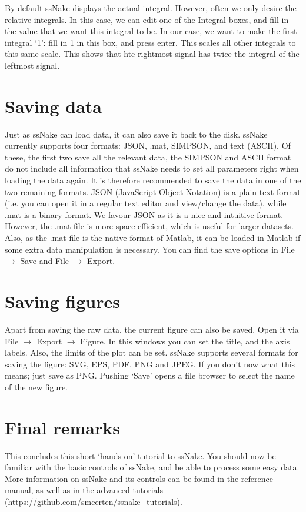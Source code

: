 \documentclass[11pt,a4paper]{article}
\begin{document}
By default ssNake displays the actual integral. However, often we only desire the relative
integrals. In this case, we can edit one of the Integral boxes, and fill in the value that we want
this integral to be. In our case, we want to make the first integral `1': fill in 1 in this box, and
press enter. This scales all other integrals to this same scale. This shows that hte rightmost
signal has twice the integral of the leftmost signal.


\section{Saving data}
Just as ssNake can load data, it can also save it back to the disk. ssNake currently supports four
formats: JSON, .mat, SIMPSON, and text (ASCII). Of these, the first two save all the relevant data,
the SIMPSON and ASCII format do not include all information that ssNake needs to set all parameters right when loading the
data again. It is therefore recommended to save the data in one of the two remaining formats. JSON
(JavaScript Object Notation) is a plain text format (i.e. you can open it in a regular text editor
and view/change the data), while .mat is a binary format. We favour JSON as it is a nice and
intuitive format. However, the .mat file is more space efficient, which is useful for larger
datasets. Also, as the .mat file is the native format of {\sc Matlab}, it can be loaded in {\sc
Matlab} if some extra data manipulation is necessary. You can find the save options in File
$\rightarrow$ Save and File $\rightarrow$ Export. 

\section{Saving figures}
Apart from saving the raw data, the current figure can also be saved. Open it via File $\rightarrow$
Export $\rightarrow$ Figure. In this windows you can set the title, and the axis labels. Also, the
limits of the plot can be set. ssNake supports several formats for saving the figure: SVG, EPS, PDF,
PNG and JPEG. If you don't now what this means; just save as PNG. Pushing `Save' opens a file
browser to select the name of the new figure.

\section{Final remarks}
This concludes this short `hands-on' tutorial to ssNake. You should now be familiar with the basic
controls of ssNake, and be able to process some easy data. More information on ssNake and its
controls can be found in the reference manual, as well as in the advanced tutorials
(\url{https://github.com/smeerten/ssnake_tutorials}).







%
%
\end{document}

